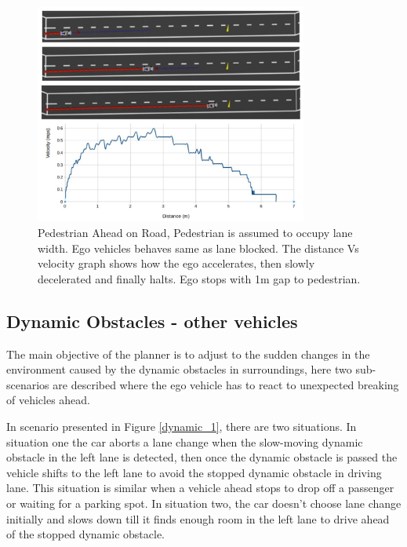 \begin{figure}
    \centering
    \includegraphics[width=0.8\textwidth]{Images/evaluation/stopping_pedestrian.jpg}
    \caption{Pedestrian Ahead on Road, Pedestrian is assumed to occupy lane width. Ego vehicles behaves same as lane blocked. The distance Vs velocity graph shows how the ego accelerates, then slowly decelerated and finally halts. Ego stops with 1m gap to pedestrian.}
    \label{pedestrian_ahead}
\end{figure}

\subsection{Dynamic Obstacles - other vehicles}
The main objective of the planner is to adjust to the sudden changes in the environment caused by the dynamic obstacles in surroundings, here two sub-scenarios are described where the ego vehicle has to react to unexpected breaking of vehicles ahead. 

In scenario presented in Figure \ref{dynamic_1}, there are two situations. In situation one the car aborts a lane change when the slow-moving dynamic obstacle in the left lane is detected, then once the dynamic obstacle is passed the vehicle shifts to the left lane to avoid the stopped dynamic obstacle in driving lane. This situation is similar when a vehicle ahead stops to drop off a passenger or waiting for a parking spot. In situation two, the car doesn't choose lane change initially and slows down till it finds enough room in the left lane to drive ahead of the stopped dynamic obstacle. 

